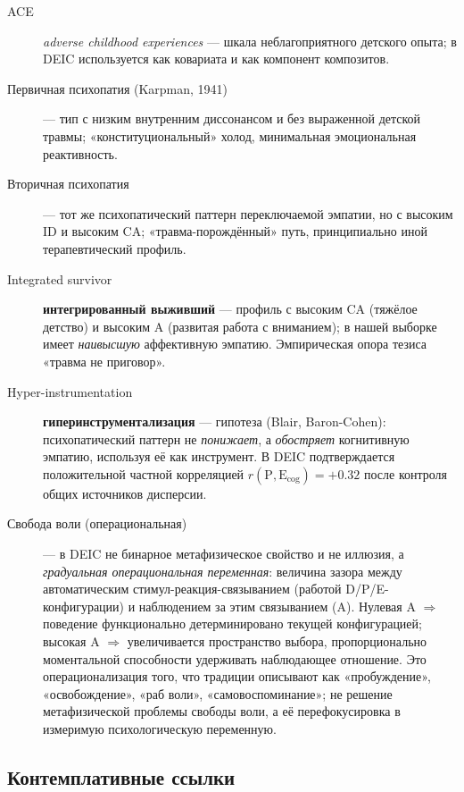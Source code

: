 \begin{description}
    \item[ACE] \textit{adverse childhood experiences} --- шкала неблагоприятного детского опыта; в DEIC используется как ковариата и как компонент композитов.
    \item[Первичная психопатия (Karpman, 1941)] --- тип с низким внутренним диссонансом и без выраженной детской травмы; «конституциональный» холод, минимальная эмоциональная реактивность.
    \item[Вторичная психопатия] --- тот же психопатический паттерн переключаемой эмпатии, но с высоким ID и высоким CA; «травма-порождённый» путь, принципиально иной терапевтический профиль.
    \item[Integrated survivor] \textbf{интегрированный выживший} --- профиль с высоким CA (тяжёлое детство) и высоким A (развитая работа с вниманием); в нашей выборке имеет \emph{наивысшую} аффективную эмпатию. Эмпирическая опора тезиса «травма не приговор».
    \item[Hyper-instrumentation] \textbf{гиперинструментализация} --- гипотеза (Blair, Baron-Cohen): психопатический паттерн не \emph{понижает}, а \emph{обостряет} когнитивную эмпатию, используя её как инструмент. В DEIC подтверждается положительной частной корреляцией $r(\text{P}, \text{E}_{\text{cog}}) = +0.32$ после контроля общих источников дисперсии.
    \item[Свобода воли (операциональная)] --- в DEIC не бинарное метафизическое свойство и не иллюзия, а \emph{градуальная операциональная переменная}: величина зазора между автоматическим стимул-реакция-связыванием (работой D/P/E-конфигурации) и наблюдением за этим связыванием (A). Нулевая A $\Rightarrow$ поведение функционально детерминировано текущей конфигурацией; высокая A $\Rightarrow$ увеличивается пространство выбора, пропорционально моментальной способности удерживать наблюдающее отношение. Это операционализация того, что традиции описывают как «пробуждение», «освобождение», «раб воли», «самовоспоминание»; не решение метафизической проблемы свободы воли, а её перефокусировка в измеримую психологическую переменную.
\end{description}

\subsection*{Контемплативные ссылки}

